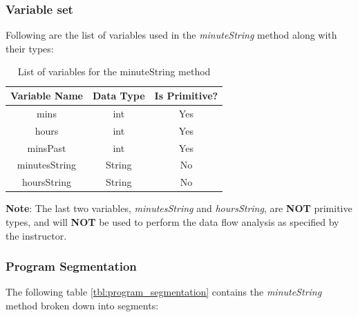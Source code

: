 \documentclass[fontsize=12pt,paper=letter,twoside]{scrartcl}
\begin{document}
\subsubsection{Variable set}

Following are the list of variables used in the \emph{minuteString} method along with their types:

\begin{table}[h]
\centering
\begin{tabular}{|c | c | c |}
	\cline{1-3}
	\textbf{Variable Name} & \textbf{Data Type} & \textbf{Is Primitive?}\\ \hline
	mins & int & Yes \\ \hline
	hours & int & Yes \\ \hline
	minsPast & int & Yes \\ \hline
	minutesString & String & No \\ \hline
	hoursString & String & No \\ \hline
\end{tabular}
\caption {List of variables for the minuteString method}
\label{tbl:list_variables}
\end{table}

\noindent \textbf{Note}: The last two variables, \emph{minutesString} and \emph{hoursString}, are \textbf{NOT} primitive types, and will \textbf{NOT} be used to perform the data flow analysis as specified by the instructor.

\subsubsection{Program Segmentation}

The following table \ref{tbl:program_segmentation} contains the \emph{minuteString} method broken down into segments:
\end{document}
